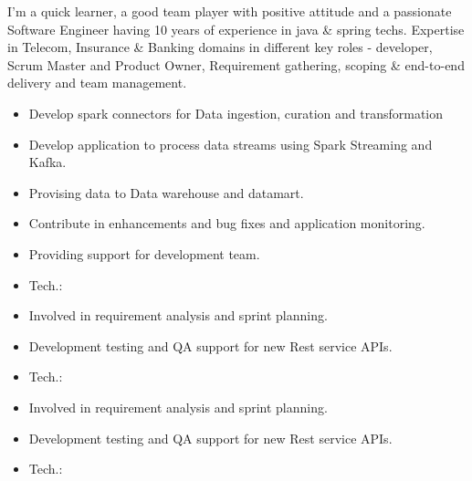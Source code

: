 \documentclass[10pt,a4paper,ragged2e,withhyper]{altacv}
\begin{document}
\begin{paracol}{2}

\begin{justify}
I’m a quick learner, a good team player with positive attitude and a passionate Software Engineer having 10 years of experience in java \& spring techs. Expertise in Telecom, Insurance \& Banking domains in different key roles - developer, Scrum Master and Product Owner, Requirement gathering, scoping \& end-to-end delivery and team management. 
\end{justify}


\begin{itemize}
\item Develop spark connectors for Data ingestion, curation and transformation
\item Develop application to process data streams using Spark Streaming and Kafka.
\item Provising data to Data warehouse and datamart.
\item Contribute in enhancements and bug fixes and application monitoring.
\item Providing support for development team.
\item Tech.:       
\end{itemize}

\divider

\begin{itemize}
\item Involved in requirement analysis and sprint planning.
\item Development testing and QA support for new Rest service APIs.
\item Tech.:     
\end{itemize}

\divider

\begin{itemize}
  \item Involved in requirement analysis and sprint planning.
  \item Development testing and QA support for new Rest service APIs.
  \item Tech.:     
\end{itemize}


\end{paracol}
\end{document}
